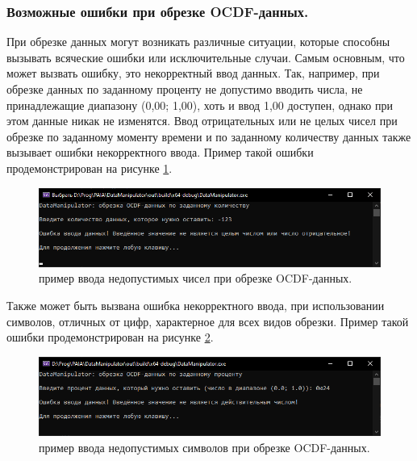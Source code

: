 \subsubsection{ \standartTitleFont
  Возможные ошибки при обрезке OCDF-данных. 
} \label{subsubsec:OCDFCutErr}

{\standartFont

  \par При обрезке данных могут возникать различные ситуации, которые способны вызывать всяческие ошибки или исключительные случаи. Самым основным, что может вызвать ошибку, это некорректный ввод данных. Так, например, при обрезке данных по заданному проценту не допустимо вводить числа, не принадлежащие диапазону (0,00; 1,00), хоть и ввод 1,00 доступен, однако при этом данные никак не изменятся. Ввод отрицательных или не целых чисел при обрезке по заданному моменту времени и по заданному количеству данных также вызывает ошибки некорректного ввода. Пример такой ошибки продемонстрирован на рисунке \ref{fig:ExOCDFdataCatErr1}.

  \begin{figure}[H]
    \centering
    \includegraphics[width=\textwidth]{images/forDataManipulator/ExOCDFdataCatError1.png}
    \caption{пример ввода недопустимых чисел при обрезке OCDF-данных.} 
    \label{fig:ExOCDFdataCatErr1}
  \end{figure}

  \par Также может быть вызвана ошибка некорректного ввода, при использовании символов, отличных от цифр, характерное для всех видов обрезки. Пример такой ошибки продемонстрирован на рисунке \ref{fig:ExOCDFdataCatErr2}.

  \begin{figure}[H]
    \centering
    \includegraphics[width=\textwidth]{images/forDataManipulator/ExOCDFdataCatError2.png}
    \caption{пример ввода недопустимых символов при обрезке OCDF-данных.} 
    \label{fig:ExOCDFdataCatErr2}
  \end{figure}

}
